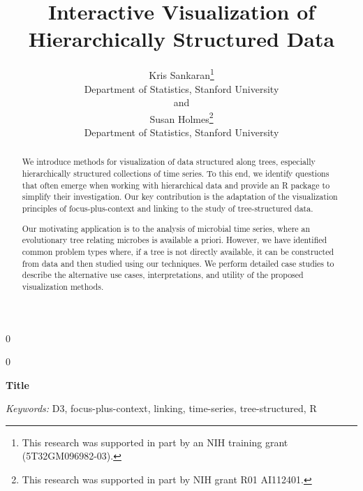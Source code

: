 \documentclass[12pt]{article}
\newcommand{\blind}{0}
\begin{document}
\def\spacingset#1{\renewcommand{\baselinestretch}%
{#1}\small\normalsize} \spacingset{1}



\blind
{
  \title{\bf Interactive Visualization of Hierarchically Structured Data}
  \author{Kris Sankaran\thanks{
      This research was supported in part by an NIH training grant (5T32GM096982-03).}\hspace{.2cm}\\
    Department of Statistics, Stanford University\\
    and \\
    Susan Holmes\thanks{
       This research was supported in part by NIH grant R01 AI112401.
      }\hspace{0.2cm}\\
    Department of Statistics, Stanford University}
  \maketitle
} \fi

\blind
{
  \bigskip
  \bigskip
  \bigskip
  \begin{center}
    {\LARGE\bf Title}
\end{center}
  \medskip
} \fi

\bigskip
\begin{abstract}
We introduce methods for visualization of data structured along trees,
especially hierarchically structured collections of time series.  To
this end, we identify questions that often emerge when working with
hierarchical data and provide an R package to simplify their
investigation. Our key contribution is the adaptation of the
visualization principles of focus-plus-context and linking to the
study of tree-structured data.

Our motivating application is to the analysis of microbial time
series, where an evolutionary tree relating microbes is available a
priori. However, we have identified common problem types where, if a
tree is not directly available, it can be constructed from data and
then studied using our techniques. We perform detailed case studies to
describe the alternative use cases, interpretations, and utility of
the proposed visualization methods.

\end{abstract}

\noindent%
{\it Keywords:}  D3, focus-plus-context, linking, time-series, tree-structured, R
\vfill
\end{document}
